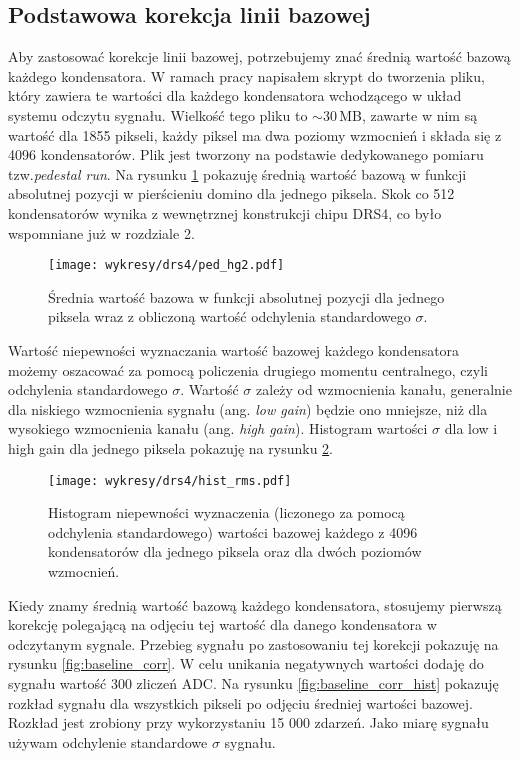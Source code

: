 \documentclass[a4paper,11pt,twoside]{article}
\begin{document}
\subsection{Podstawowa korekcja linii bazowej}
Aby zastosować korekcje linii bazowej, potrzebujemy znać średnią wartość bazową każdego kondensatora. W ramach pracy napisałem skrypt do tworzenia pliku, który zawiera te wartości dla każdego kondensatora wchodzącego w układ systemu odczytu sygnału. Wielkość tego pliku to $\sim 30$\,MB, zawarte w nim są wartość dla 1855 pikseli, każdy piksel ma dwa poziomy wzmocnień i składa się z 4096 kondensatorów. Plik jest tworzony na podstawie dedykowanego pomiaru tzw.\textsl{pedestal run}. Na rysunku \ref{fig:ped_4096} pokazuję średnią wartość bazową w funkcji absolutnej pozycji w pierścieniu domino dla jednego piksela. Skok co 512 kondensatorów wynika z wewnętrznej konstrukcji chipu DRS4, co było wspomniane już w rozdziale 2.
\begin{figure}[H] 
\centering
\texttt{[image: wykresy/drs4/ped\_hg2.pdf]}
\caption{Średnia wartość bazowa w funkcji absolutnej pozycji dla jednego piksela wraz z obliczoną wartość odchylenia standardowego $\sigma$.}
\label{fig:ped_4096}
\end{figure}
Wartość niepewności wyznaczania wartość bazowej każdego kondensatora możemy oszacować za pomocą policzenia drugiego momentu centralnego, czyli odchylenia standardowego $\sigma$. 
Wartość $\sigma$ zależy od wzmocnienia kanału, generalnie dla niskiego wzmocnienia sygnału (ang. \textsl{low gain}) będzie ono mniejsze, niż dla wysokiego wzmocnienia kanału (ang. \textsl{high gain}). Histogram wartości $\sigma$ dla low i high gain dla jednego piksela pokazuję na rysunku \ref{fig:hist_rms}.
\begin{figure}[H] 
\centering
\texttt{[image: wykresy/drs4/hist\_rms.pdf]}
\caption{Histogram niepewności wyznaczenia (liczonego za pomocą odchylenia standardowego) wartości bazowej każdego z 4096 kondensatorów dla jednego piksela oraz dla dwóch poziomów wzmocnień.}
\label{fig:hist_rms}
\end{figure}
\newpage
Kiedy znamy średnią wartość bazową każdego kondensatora, stosujemy pierwszą korekcję polegającą na odjęciu tej wartość dla danego kondensatora w odczytanym sygnale. Przebieg sygnału po zastosowaniu tej korekcji pokazuję na rysunku \ref{fig:baseline_corr}. W celu unikania negatywnych wartości dodaję do sygnału wartość 300 zliczeń ADC. Na rysunku \ref{fig:baseline_corr_hist} pokazuję rozkład sygnału dla wszystkich pikseli po odjęciu średniej wartości bazowej. Rozkład jest zrobiony przy wykorzystaniu 15 000 zdarzeń. Jako miarę sygnału używam odchylenie standardowe $\sigma$ sygnału.
\end{document}

